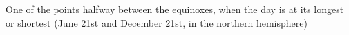 One of the points halfway between the equinoxes, when the day is at its longest
or shortest (June 21st and December 21st, in the northern hemisphere)
